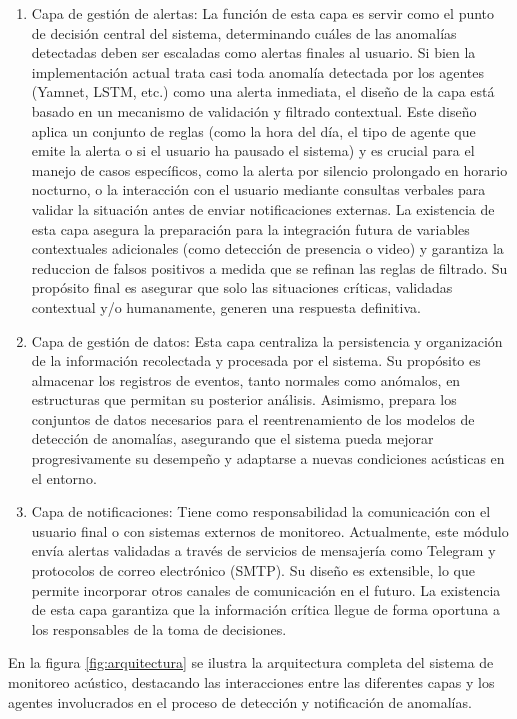 \begin{enumerate}
      \item Capa de gestión de alertas: La función de esta capa es servir como el punto de decisión central del sistema, determinando cuáles de las anomalías detectadas deben ser escaladas como alertas finales al usuario. Si bien la implementación actual trata casi toda anomalía detectada por los agentes (Yamnet, LSTM, etc.) como una alerta inmediata, el diseño de la capa está basado en un mecanismo de validación y filtrado contextual. Este diseño aplica un conjunto de reglas (como la hora del día, el tipo de agente que emite la alerta o si el usuario ha pausado el sistema) y es crucial para el manejo de casos específicos, como la alerta por silencio prolongado en horario nocturno, o la interacción con el usuario mediante consultas verbales para validar la situación antes de enviar notificaciones externas. La existencia de esta capa asegura la preparación para la integración futura de variables contextuales adicionales (como detección de presencia o video) y garantiza la reduccion de falsos positivos a medida que se refinan las reglas de filtrado. Su propósito final es asegurar que solo las situaciones críticas, validadas contextual y/o humanamente, generen una respuesta definitiva.
      \item Capa de gestión de datos: Esta capa centraliza la persistencia y organización de la información recolectada y procesada por el sistema. Su propósito es almacenar los registros de eventos, tanto normales como anómalos, en estructuras que permitan su posterior análisis. Asimismo, prepara los conjuntos de datos necesarios para el reentrenamiento de los modelos de detección de anomalías, asegurando que el sistema pueda mejorar progresivamente su desempeño y adaptarse a nuevas condiciones acústicas en el entorno.
      \item Capa de notificaciones: Tiene como responsabilidad la comunicación con el usuario final o con sistemas externos de monitoreo. Actualmente, este módulo envía alertas validadas a través de servicios de mensajería como Telegram y protocolos de correo electrónico (SMTP). Su diseño es extensible, lo que permite incorporar otros canales de comunicación en el futuro. La existencia de esta capa garantiza que la información crítica llegue de forma oportuna a los responsables de la toma de decisiones.
\end{enumerate}

En la figura \ref{fig:arquitectura} se ilustra la arquitectura completa del sistema de monitoreo acústico, destacando las interacciones entre las diferentes capas y los agentes involucrados en el proceso de detección y notificación de anomalías.


